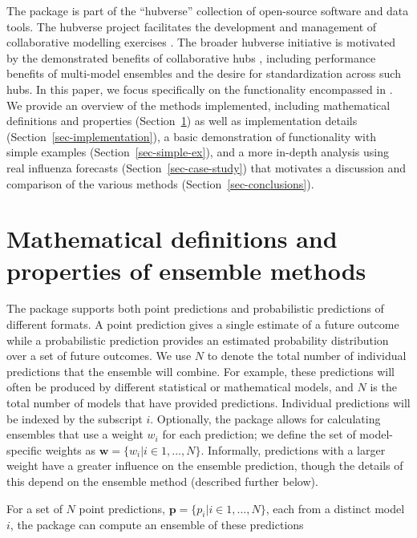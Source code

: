 \documentclass[
  article,
  shortnames,
  notitle]{jss}
\begin{document}
The  package is part of the ``hubverse'' collection of
open-source software and data tools. The hubverse project facilitates
the development and management of collaborative modelling exercises
\citep{hubverse_docs}. The broader hubverse initiative is motivated by
the demonstrated benefits of collaborative hubs
\citep{reich2022, borchering_public_2023}, including performance
benefits of multi-model ensembles and the desire for standardization
across such hubs. In this paper, we focus specifically on the
functionality encompassed in . We provide an overview
of the methods implemented, including mathematical definitions and
properties (Section~\ref{sec-defs}) as well as implementation details
(Section~\ref{sec-implementation}), a basic demonstration of
functionality with simple examples (Section~\ref{sec-simple-ex}), and a
more in-depth analysis using real influenza forecasts
(Section~\ref{sec-case-study}) that motivates a discussion and
comparison of the various methods (Section~\ref{sec-conclusions}).

\section{Mathematical definitions and properties of ensemble
methods}\label{sec-defs}

The  package supports both point predictions and
probabilistic predictions of different formats. A point prediction gives
a single estimate of a future outcome while a probabilistic prediction
provides an estimated probability distribution over a set of future
outcomes. We use \(N\) to denote the total number of individual
predictions that the ensemble will combine. For example, these
predictions will often be produced by different statistical or
mathematical models, and \(N\) is the total number of models that have
provided predictions. Individual predictions will be indexed by the
subscript \(i\). Optionally, the package allows for calculating
ensembles that use a weight \(w_i\) for each prediction; we define the
set of model-specific weights as
\(\pmb{w} = \{w_i | i \in 1, ..., N\}\). Informally, predictions with a
larger weight have a greater influence on the ensemble prediction,
though the details of this depend on the ensemble method (described
further below).

For a set of \(N\) point predictions,
\(\pmb{p} = \{p_i|i \in 1, ..., N\}\), each from a distinct model \(i\),
the  package can compute an ensemble of these
predictions
\end{document}
